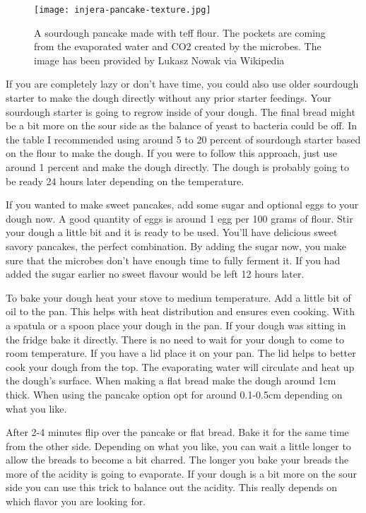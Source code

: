 \begin{figure}[htb!]
  \texttt{[image: injera-pancake-texture.jpg]}
  \centering
  \caption{A sourdough pancake made with teff flour. The pockets are coming from
  the evaporated water and CO2 created by the microbes.
  The image has been provided by Lukasz Nowak via Wikipedia}
\end{figure}

If you are completely lazy or don't have time, you could also use older sourdough starter
to make the dough directly without any prior starter feedings. Your sourdough starter
is going to regrow inside of your dough. The
final bread might be a bit more on the sour side as the balance of yeast to
bacteria could be off. In the table I recommended using around 5 to 20 percent
of sourdough starter based on the flour to make the dough. If you were to follow
this approach, just use around 1 percent and make the dough directly.
The dough is probably going to be ready 24 hours later depending on the temperature.

If you wanted to make sweet pancakes, add some sugar and optional eggs to your dough
now. A good quantity of eggs is around 1 egg per 100 grams of flour.
Stir your dough a little bit and it is ready to be used. You'll 
have delicious sweet savory pancakes, the perfect combination. By
adding the sugar now, you make sure that the microbes don't have
enough time to fully ferment it. If you had added the sugar
earlier no sweet flavour would be left 12 hours later.

To bake your dough heat your stove to medium temperature. Add a little bit of
oil to the pan. This helps with heat distribution and ensures even cooking.
With a spatula or a spoon place your dough in the pan. If your dough
was sitting in the fridge bake it directly. There is no need to wait for your
dough to come to room temperature. If you have a lid
place it on your pan. The lid helps to better cook your dough from the top.
The evaporating water will circulate and heat up the dough's surface. When
making a flat bread make the dough around 1cm thick. When using the pancake
option opt for around 0.1-0.5cm depending on what you like.

After 2-4 minutes flip over the pancake or flat bread. Bake it for the same
time from the other side. Depending on what you like, you can wait a little
longer to allow the breads to become a bit charred.  The longer you
bake your breads the more of the acidity is going to evaporate. If your
dough is a bit more on the sour side you can use this trick to balance
out the acidity. This really depends on which flavor you are looking for.

